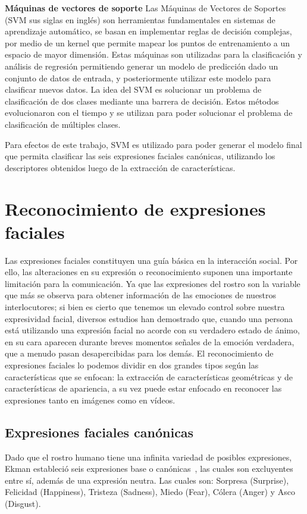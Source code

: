 	\textbf{Máquinas de vectores de soporte}
	\label{sec:svm}
	Las Máquinas de Vectores de Soportes (SVM sus siglas en inglés) son herramientas fundamentales en sistemas de aprendizaje automático, se basan en  implementar reglas de decisión complejas, por medio de un kernel que permite mapear los puntos de entrenamiento a un espacio de mayor dimensión. Estas máquinas son utilizadas para la clasificación y análisis de regresión permitiendo generar un modelo de predicción dado un conjunto de datos de entrada, y posteriormente utilizar este modelo para clasificar nuevos datos.
La idea del SVM es solucionar un problema de clasificación de dos clases mediante una barrera de decisión. Estos métodos evolucionaron con el tiempo y se utilizan para poder solucionar el problema de clasificación de múltiples clases.

Para efectos de este trabajo, SVM es utilizado para poder generar el modelo final que permita clasificar las seis expresiones faciales canónicas, utilizando los descriptores obtenidos luego de la extracción de características.

\section{Reconocimiento de expresiones faciales}
\label{sec:fer}
Las expresiones faciales constituyen una guía básica en la interacción social. Por ello, las alteraciones en su expresión o reconocimiento suponen una importante limitación para la comunicación. Ya que las expresiones del rostro son la variable que más se observa para obtener información de las emociones de nuestros interlocutores; si bien es cierto que tenemos un elevado control sobre nuestra expresividad facial, diversos estudios han demostrado que, cuando una persona está utilizando una expresión facial no acorde con su verdadero estado de ánimo, en su cara aparecen durante breves momentos señales de la emoción verdadera, que a menudo pasan desapercibidas para los demás.
El reconocimiento de expresiones faciales lo podemos dividir en dos grandes tipos según las características que se enfocan: la extracción de características geométricas y de características de apariencia, a su vez puede estar enfocado en reconocer las expresiones tanto en imágenes como en vídeos.  


\subsection{Expresiones faciales canónicas}
\label{sec:type_fe}
Dado que el rostro humano tiene una infinita variedad de posibles expresiones, Ekman estableció seis expresiones base o canónicas~\cite{Ekman1981}, las cuales son excluyentes entre sí, además de una expresión neutra. Las cuales son: Sorpresa (Surprise), Felicidad (Happiness), Tristeza (Sadness), Miedo (Fear), Cólera (Anger) y Asco (Disgust).


